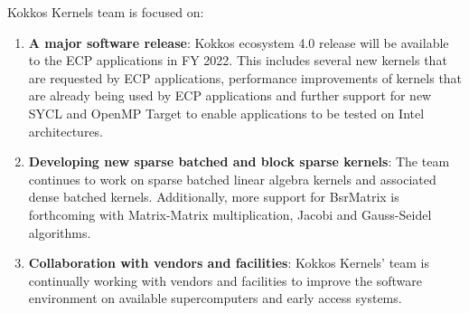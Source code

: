 Kokkos Kernels team is focused on:
\begin{enumerate}
	\item \textbf{A major software release}: Kokkos ecosystem 4.0 release 
	will be available to the ECP applications in FY 2022. This includes several new 
	kernels that are requested by ECP applications, performance improvements of
	kernels that are already being used by ECP applications and further support for
        new SYCL and OpenMP Target to enable applications to be tested on Intel architectures.
	\item \textbf{Developing new sparse batched and block sparse kernels}: The team continues
        to work on sparse batched linear algebra kernels and associated dense batched kernels.
        Additionally, more support for BsrMatrix is forthcoming with Matrix-Matrix multiplication,
        Jacobi and Gauss-Seidel algorithms.
	\item \textbf{Collaboration with vendors and facilities}: Kokkos Kernels' team is
        continually working with vendors and facilities to improve the software environment
        on available supercomputers and early access systems.
\end{enumerate}
